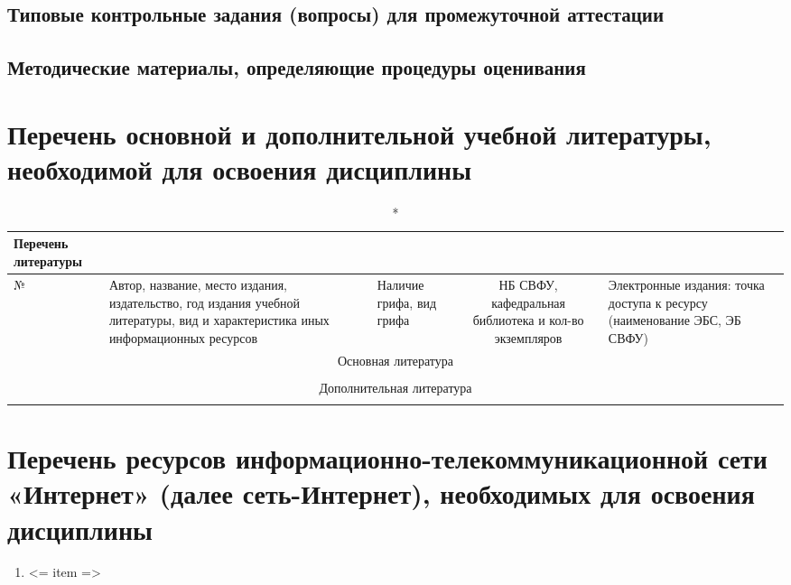 \documentclass[a4paper,12pt]{article}
\begin{document}
\subsection{Типовые контрольные задания (вопросы) для промежуточной аттестации}
\subsection{Методические материалы, определяющие процедуры оценивания}


\newpage
\section{Перечень основной и дополнительной учебной литературы, необходимой для освоения дисциплины}

  \begin{longtable}{|l|p{7cm}|p{18mm}|c|p{32mm}|}
  \caption*{Перечень литературы}\\
  \hline
  № & 
  \centering\small\arraybackslash Автор, название, место издания, издательство, год издания учебной литературы, вид и характеристика иных информационных ресурсов &
  \multicolumn{1}{p{18mm}|}{\centering\small\arraybackslash Наличие грифа, вид грифа} &
  \multicolumn{1}{p{21mm}|}{\centering\small\arraybackslash НБ СВФУ, кафедральная библиотека и кол-во экземпляров} & 
  \centering\small\arraybackslash Электронные издания: точка доступа к ресурсу (наименование ЭБС, ЭБ СВФУ)\\
  \hline
  \multicolumn{5}{|c|}{Основная литература}\\
  \hline
  \\
  \hline
  \multicolumn{5}{|c|}{Дополнительная литература}\\
  \hline
  \\
  \hline
  \end{longtable}
  
\section{Перечень ресурсов информационно-телекоммуникационной сети «Интернет» (далее сеть-Интернет), необходимых для освоения дисциплины}
\begin{enumerate}
  \item <= item => 
\end{enumerate}
\end{document}
